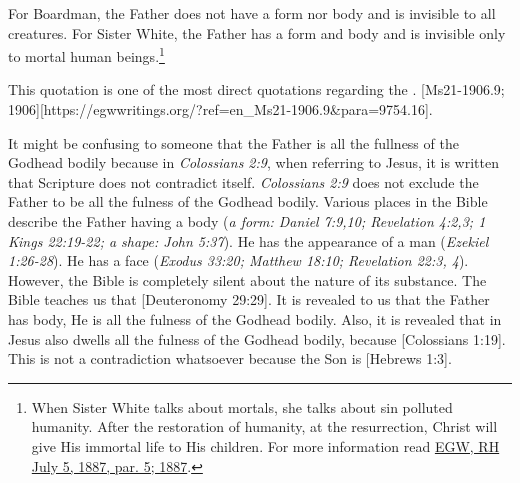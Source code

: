 For Boardman, the Father does not have a form nor body and is invisible to all creatures. For Sister White, the Father has a form and body and is invisible only to mortal human beings.\footnote{When Sister White talks about mortals, she talks about sin polluted humanity. After the restoration of humanity, at the resurrection, Christ will give His immortal life to His children. For more information read \href{https://egwwritings.org/?ref=en_RH.July.5.1887.par.5}{{EGW, RH July 5, 1887, par. 5; 1887}}.}

This quotation is one of the most direct quotations regarding the . [Ms21-1906.9; 1906][https://egwwritings.org/?ref=en\_Ms21-1906.9&para=9754.16].

It might be confusing to someone that the Father is all the fullness of the Godhead bodily because in \textit{Colossians 2:9}, when referring to Jesus, it is written that  Scripture does not contradict itself. \textit{Colossians 2:9} does not exclude the Father to be all the fulness of the Godhead bodily. Various places in the Bible describe the Father having a body (\textit{a form: Daniel 7:9,10; Revelation 4:2,3; 1 Kings 22:19-22; a shape: John 5:37}). He has the appearance of a man (\textit{Ezekiel 1:26-28}). He has a face (\textit{Exodus 33:20; Matthew 18:10; Revelation 22:3, 4}). However, the Bible is completely silent about the nature of its substance. The Bible teaches us that [Deuteronomy 29:29]. It is revealed to us that the Father has body, He is all the fulness of the Godhead bodily. Also, it is revealed that in Jesus also dwells all the fulness of the Godhead bodily, because [Colossians 1:19]. This is not a contradiction whatsoever because the Son is [Hebrews 1:3].


